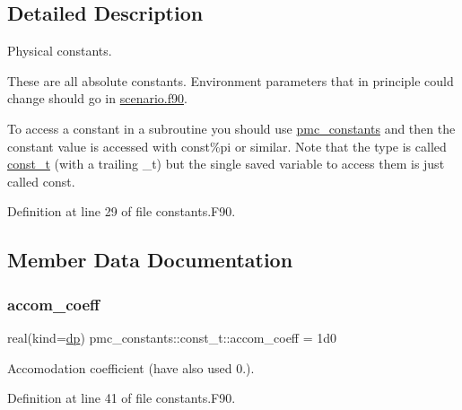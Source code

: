 \subsection{Detailed Description}
Physical constants. 

These are all absolute constants. Environment parameters that in principle could change should go in \mbox{\hyperlink{scenario_8_f90}{scenario.\+f90}}.

To access a constant in a subroutine you should {\ttfamily use \mbox{\hyperlink{namespacepmc__constants}{pmc\+\_\+constants}}} and then the constant value is accessed with {\ttfamily const\%pi} or similar. Note that the type is called {\ttfamily \mbox{\hyperlink{structpmc__constants_1_1const__t}{const\+\_\+t}}} (with a trailing \+\_\+t) but the single saved variable to access them is just called {\ttfamily const}. 

Definition at line 29 of file constants.\+F90.



\subsection{Member Data Documentation}
\mbox{\label{structpmc__constants_1_1const__t_ad650ce072901e84d9597318dd315ba66}} 
\subsubsection{\texorpdfstring{accom\+\_\+coeff}{accom\_coeff}}
{\footnotesize\ttfamily real(kind=\mbox{\hyperlink{namespacepmc__constants_a396b7709ed4da67dac74cb46a1466ed6}{dp}}) pmc\+\_\+constants\+::const\+\_\+t\+::accom\+\_\+coeff = 1d0}



Accomodation coefficient (have also used 0.). 



Definition at line 41 of file constants.\+F90.

\mbox{\label{structpmc__constants_1_1const__t_a3ad84a6c86dd201773e760ceceff23ea}} 
